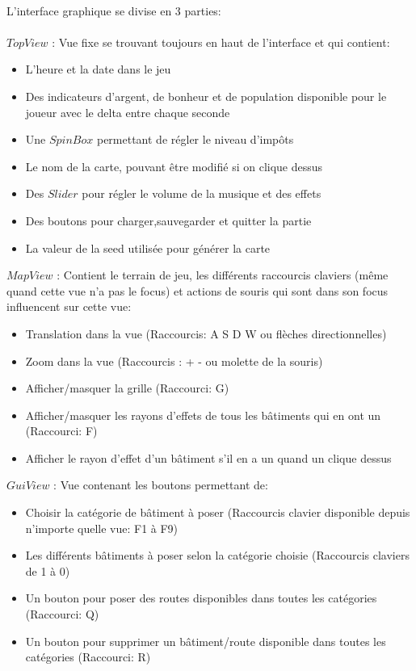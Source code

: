\documentclass[a4paper,10pt,openany,oneside]{report}
\begin{document}
\paragraph{}
L'interface graphique se divise en 3 parties:\\\\
$TopView$ : Vue fixe se trouvant toujours en haut de l'interface et qui contient:
\begin{itemize}
\item L'heure et la date dans le jeu
\item Des indicateurs d'argent, de bonheur et de population disponible pour le joueur avec le delta entre chaque seconde
\item Une $SpinBox$ permettant de régler le niveau d'impôts
\item Le nom de la carte, pouvant être modifié si on clique dessus
\item Des $Slider$ pour régler le volume de la musique et des effets
\item Des boutons pour charger,sauvegarder et quitter la partie
\item La valeur de la seed utilisée pour générer la carte
\end{itemize}
$MapView$ : Contient le terrain de jeu, les différents raccourcis claviers (même quand cette vue n'a pas le focus) et actions de souris qui sont dans son focus influencent sur cette vue:
\begin{itemize}
\item Translation dans la vue (Raccourcis: A S D W ou flèches directionnelles)
\item Zoom dans la vue (Raccourcis : + - ou molette de la souris)
\item Afficher/masquer la grille (Raccourci: G)
\item Afficher/masquer les rayons d'effets de tous les bâtiments qui en ont un (Raccourci: F)
\item Afficher le rayon d'effet d'un bâtiment s'il en a un quand un clique dessus
\end{itemize}
$GuiView$ : Vue contenant les boutons permettant de:
\begin{itemize}
\item Choisir la catégorie de bâtiment à poser (Raccourcis clavier disponible depuis n'importe quelle vue: F1 à F9)
\item Les différents bâtiments à poser selon la catégorie choisie (Raccourcis claviers de 1 à 0)
\item Un bouton pour poser des routes disponibles dans toutes les catégories (Raccourci: Q)
\item Un bouton pour supprimer un bâtiment/route disponible dans toutes les catégories (Raccourci: R)
\end{itemize}
\end{document}
